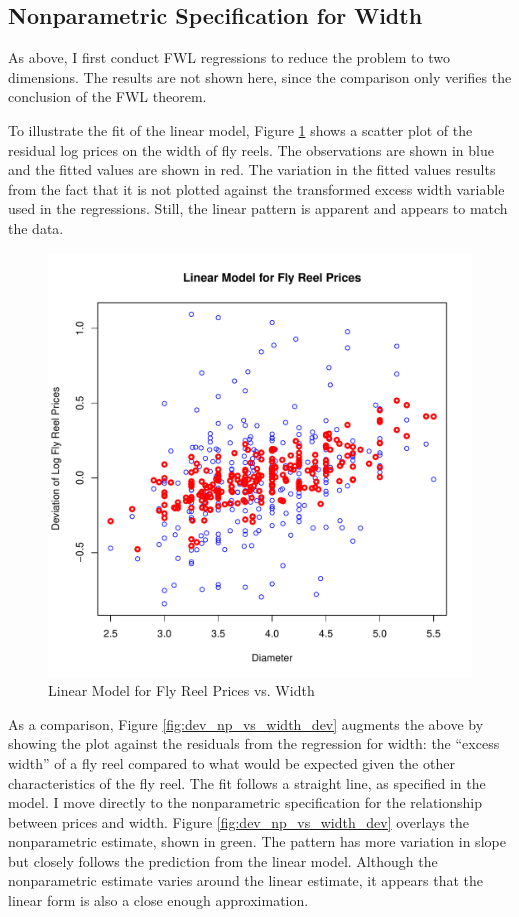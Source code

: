 \subsection{Nonparametric Specification for Width}

As above, I first conduct FWL regressions 
to reduce the problem to two dimensions. 
The results are not shown here, 
since the comparison only verifies 
the conclusion of the FWL theorem. 

To illustrate the fit of the linear model, 
Figure \ref{fig:dev_vs_width} shows a scatter plot 
of the residual log prices on 
the width of fly reels. 
The observations are shown in blue
and the fitted values are shown in red.
The variation in the fitted values results from the 
fact that it is not plotted against the transformed 
excess width variable 
used in the regressions.
Still, the linear pattern is apparent
and appears to match the data. 

\begin{figure}[h!]
  \centering
  \includegraphics[scale = 0.5, keepaspectratio=true]{../Figures/dev_vs_diameter}
  \caption{Linear Model for Fly Reel Prices vs. Width} \label{fig:dev_vs_width}
\end{figure}



\pagebreak
As a comparison, Figure \ref{fig:dev_np_vs_width_dev} 
augments the above by showing the plot against the 
residuals from the regression for 
width:
the ``excess width'' of a fly reel 
compared to what would be 
expected given the other characteristics of the fly reel. 
The fit follows a straight line, as specified in the model. 
% 
I move directly to the nonparametric specification for 
the relationship between prices and 
width.
Figure \ref{fig:dev_np_vs_width_dev} 
overlays the nonparametric estimate, shown in green. 
The pattern has more variation in slope but 
closely follows the prediction from the linear model. 
Although the nonparametric estimate varies around the linear estimate,
it appears that the linear form
is also a close enough approximation.


